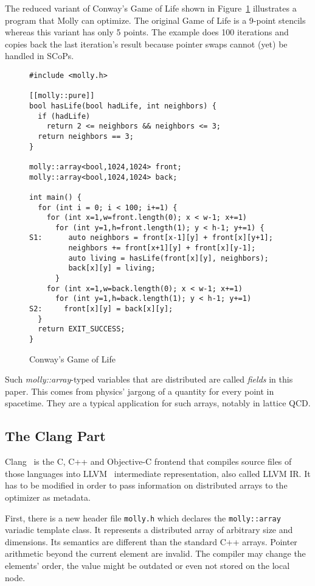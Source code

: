 \documentclass{sigplanconf}
\begin{document}
The reduced variant of Conway's Game of Life shown in Figure~\ref{fig:conway} illustrates a program that Molly can optimize. The original Game of Life is a 9-point stencils whereas this variant has only 5 points. The example does 100 iterations and copies back the last iteration's result because pointer swaps cannot (yet) be handled in SCoPs.

\begin{figure}[htb]
{\small\begin{verbatim}
#include <molly.h>

[[molly::pure]] 
bool hasLife(bool hadLife, int neighbors) {
  if (hadLife)
    return 2 <= neighbors && neighbors <= 3;
  return neighbors == 3;
}

molly::array<bool,1024,1024> front;
molly::array<bool,1024,1024> back;

int main() {
  for (int i = 0; i < 100; i+=1) {
    for (int x=1,w=front.length(0); x < w-1; x+=1)
      for (int y=1,h=front.length(1); y < h-1; y+=1) {
S1:      auto neighbors = front[x-1][y] + front[x][y+1];
         neighbors += front[x+1][y] + front[x][y-1];  
         auto living = hasLife(front[x][y], neighbors);     
         back[x][y] = living;
      }
    for (int x=1,w=back.length(0); x < w-1; x+=1)
      for (int y=1,h=back.length(1); y < h-1; y+=1)
S2:     front[x][y] = back[x][y];
  }
  return EXIT_SUCCESS;
}
\end{verbatim}}
\caption{Conway's Game of Life}\label{fig:conway}
\end{figure}

Such \emph{molly::array}-typed variables that are distributed are called \emph{fields} in this paper. This comes from physics' jargong of a quantity for every point in spacetime. They are a typical application for such arrays, notably in lattice QCD.


\subsection{The Clang Part}

Clang~\cite{clang} is the C, C++ and Objective-C frontend that compiles source files of those languages into LLVM~\cite{llvm} intermediate representation, also called LLVM IR. It has to be modified in order to pass information on distributed arrays to the optimizer as metadata.

First, there is a new header file \texttt{molly.h} which declares the \texttt{molly::array} variadic template class. It represents a distributed array of arbitrary size and dimensions. Its semantics are different than the standard C++ arrays. Pointer arithmetic beyond the current element are invalid. The compiler may change the elements' order, the value might be outdated or even not stored on the local node.
\end{document}
